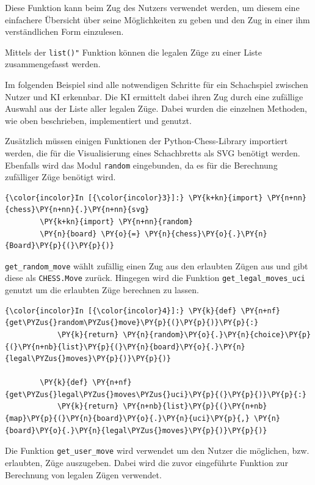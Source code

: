 Diese Funktion kann beim Zug des Nutzers verwendet werden, um diesem
eine einfachere Übersicht über seine Möglichkeiten zu geben und den Zug
in einer ihm verständlichen Form einzulesen.

Mittels der \texttt{list()"} Funktion können die legalen Züge zu einer
Liste zusammengefasst werden.

Im folgenden Beispiel sind alle notwendigen Schritte für ein Schachspiel
zwischen Nutzer und KI erkennbar. Die KI ermittelt dabei ihren Zug durch
eine zufällige Auswahl aus der Liste aller legalen Züge. Dabei wurden
die einzelnen Methoden, wie oben beschrieben, implementiert und genutzt.

Zusätzlich müssen einigen Funktionen der Python-Chess-Library importiert
werden, die für die Visualisierung eines Schachbretts als SVG benötigt
werden. Ebenfalls wird das Modul \texttt{random} eingebunden, da es für
die Berechnung zufälliger Züge benötigt wird.

    \begin{Verbatim}[commandchars=\\\{\}]
{\color{incolor}In [{\color{incolor}3}]:} \PY{k+kn}{import} \PY{n+nn}{chess}\PY{n+nn}{.}\PY{n+nn}{svg}
        \PY{k+kn}{import} \PY{n+nn}{random}
        \PY{n}{board} \PY{o}{=} \PY{n}{chess}\PY{o}{.}\PY{n}{Board}\PY{p}{(}\PY{p}{)}
\end{Verbatim}


    \texttt{get\_random\_move} wählt zufällig einen Zug aus den erlaubten
Zügen aus und gibt diese als \texttt{CHESS.Move} zurück. Hingegen wird
die Funktion \texttt{get\_legal\_moves\_uci} genutzt um die erlaubten
Züge berechnen zu lassen.

    \begin{Verbatim}[commandchars=\\\{\}]
{\color{incolor}In [{\color{incolor}4}]:} \PY{k}{def} \PY{n+nf}{get\PYZus{}random\PYZus{}move}\PY{p}{(}\PY{p}{)}\PY{p}{:}
            \PY{k}{return} \PY{n}{random}\PY{o}{.}\PY{n}{choice}\PY{p}{(}\PY{n+nb}{list}\PY{p}{(}\PY{n}{board}\PY{o}{.}\PY{n}{legal\PYZus{}moves}\PY{p}{)}\PY{p}{)}
        
        \PY{k}{def} \PY{n+nf}{get\PYZus{}legal\PYZus{}moves\PYZus{}uci}\PY{p}{(}\PY{p}{)}\PY{p}{:}
            \PY{k}{return} \PY{n+nb}{list}\PY{p}{(}\PY{n+nb}{map}\PY{p}{(}\PY{n}{board}\PY{o}{.}\PY{n}{uci}\PY{p}{,} \PY{n}{board}\PY{o}{.}\PY{n}{legal\PYZus{}moves}\PY{p}{)}\PY{p}{)}
\end{Verbatim}


    Die Funktion \texttt{get\_user\_move} wird verwendet um den Nutzer die
möglichen, bzw. erlaubten, Züge auszugeben. Dabei wird die zuvor
eingeführte Funktion zur Berechnung von legalen Zügen verwendet.

